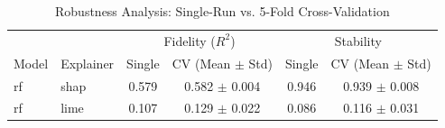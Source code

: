 \begin{table}[htbp]
\centering
\caption{Robustness Analysis: Single-Run vs. 5-Fold Cross-Validation}
\label{tab:cv_comparison}
\begin{tabular}{ll c c | c c}
\toprule
& & \multicolumn{2}{c}{Fidelity ($R^2$)} & \multicolumn{2}{c}{Stability} \\
Model & Explainer & Single & CV (Mean $\pm$ Std) & Single & CV (Mean $\pm$ Std) \\
\midrule
rf & shap & 0.579 & 0.582 $\pm$ 0.004 & 0.946 & 0.939 $\pm$ 0.008 \\
rf & lime & 0.107 & 0.129 $\pm$ 0.022 & 0.086 & 0.116 $\pm$ 0.031 \\
\bottomrule
\end{tabular}
\end{table}